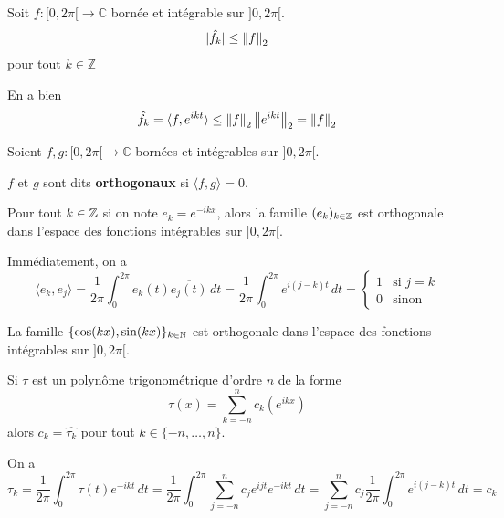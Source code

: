 \documentclass[a4paper,12pt]{article}
\begin{document}
\begin{proposition}{}{}
    Soit $f: [0, 2\pi[ \to \mathbb{C}$ bornée et intégrable sur $]0, 2\pi[$.
    $$
    |\hat{f_k}| \leq \left\lVert f\right\rVert_2
    $$
    pour tout $k \in \mathbb{Z}$
\end{proposition}

\begin{demonstration}
    En a bien
    $$
    \hat{f_k} = \langle f, e^{ikt} \rangle \leq \left\lVert f\right\rVert_2 \left\lVert e^{ikt}\right\rVert_2 = \left\lVert f\right\rVert_2
    $$
\end{demonstration}

\begin{definition}
    Soient $f, g: [0, 2\pi[ \to \mathbb{C}$ bornées et intégrables sur $]0, 2\pi[$.
    
    $f$ et $g$ sont dits \textbf{orthogonaux} si $\langle f, g \rangle = 0$.
\end{definition}

\begin{theoreme}{}{}
    Pour tout $k \in \mathbb{Z}$ si on note $e_k = e^{-ikx}$, alors la famille $(e_k)_{k \in \mathbb{Z}}$ est orthogonale dans l'espace des fonctions intégrables sur $]0, 2\pi[$.
\end{theoreme}

\begin{demonstration}
    Immédiatement, on a
    $$
    \langle e_k, e_j \rangle = \frac{1}{2\pi} \int_0^{2\pi} e_k(t) \overline{e_j(t)} \, dt = \frac{1}{2\pi} \int_0^{2\pi} e^{i(j-k)t} \, dt = \begin{cases}
        1 & \text{si } j = k \\
        0 & \text{sinon}
    \end{cases} 
    $$    
\end{demonstration}

\begin{corollaire}{}{}
    La famille $\{ \cos(kx), \sin(kx) \}_{k \in \mathbb{N}}$ est orthogonale dans l'espace des fonctions intégrables sur $]0, 2\pi[$.
\end{corollaire}

\begin{corollaire}{}{}
    Si $\tau$ est un polynôme trigonométrique d'ordre $n$ de la forme
    $$
    \tau(x) = \sum_{k=-n}^n c_k (e^{ikx})
    $$
    alors $c_k = \hat{\tau_k}$ pour tout $k \in \{-n, \dots, n\}$.
\end{corollaire}

\begin{demonstration}
    On a
    $$
    \hat{\tau_k} = \frac{1}{2\pi} \int_0^{2\pi} \tau(t) e^{-ikt} \, dt = \frac{1}{2\pi} \int_0^{2\pi} \sum_{j=-n}^n c_j e^{ijt} e^{-ikt} \, dt = \sum_{j=-n}^n c_j \frac{1}{2\pi} \int_0^{2\pi} e^{i(j-k)t} \, dt = c_k
    $$
\end{demonstration}
\end{document}
